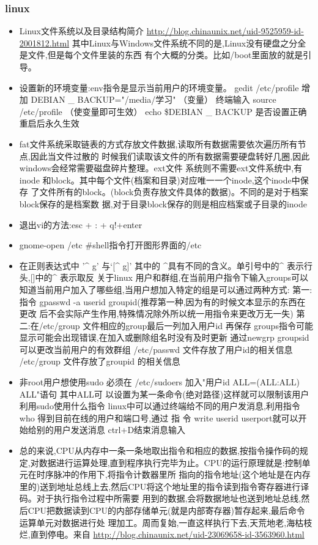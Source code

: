 \documentclass[11pt]{article}
\begin{document}
\subsubsection{linux}
\label{sec-1-2-2}
\begin{itemize}
\item Linux文件系统以及目录结构简介
\url{http://blog.chinaunix.net/uid-9525959-id-2001812.html}
其中Linux与Windows文件系统不同的是,Linux没有硬盘之分全是文件,但是每个文件里装的东西
有个大概的分类。比如/boot里面放的就是引导。
\item 设置新的环境变量:env指令是显示当前用户的环境变量。
gedit /etc/profile
增加 DEBIAN \_ BACKUP="/media/学习" （变量）
终端输入 source /etc/profile  （使变量即可生效）
echo \$DEBIAN \_ BACKUP 是否设置正确
重启后永久生效
\item fat文件系统采取链表的方式存放文件数据,读取所有数据需要依次遍历所有节点,因此当文件过散的
时候我们读取该文件的所有数据需要硬盘转好几圈,因此windows会经常需要磁盘碎片整理。ext文件
系统则不需要ext文件系统中,有inode 和block。其中每个文件(档案和目录)对应唯一一个inode,这个inode中保存
了文件所有的block。(block负责存放文件具体的数据)。不同的是对于档案block保存的是档案数
据,对于目录block保存的则是相应档案或子目录的inode
\item 退出vi的方法:esc + : + q!+enter
\item gnome-open /etc \#shell指令打开图形界面的/etc
\item 在正则表达式中 ’\^{} g’ 与‘[\^{} g]’ 其中的 \^{}具有不同的含义。单引号中的\^{} 表示行头,[]中的\^{} 表示取反
关于linux 用户和群组,在当前用户指令下输入groups可以知道当前用户加入了哪些组,当用户想加入特定的组是可以通过两种方式:
第一:指令 gpasswd -a userid groupid(推荐第一种,因为有的时候文本显示的东西在更改
后不会实际产生作用,特殊情况除外所以统一用指令来更改万无一失)
第二:在/etc/group 文件相应的group最后一列加入用户id 再保存
groups指令可能显示可能会出现错误,在加入或删除组名时没有及时更新
通过newgrp groupsid 可以更改当前用户的有效群组 /etc/passwd 文件存放了用户id的相关信息
/etc/group 文件存放了groupid 的相关信息
\item 非root用户想使用sudo 必须在 /etc/sudoers 加入"用户id ALL=(ALL:ALL) ALL"语句 其中ALL可
  以设置为某一条命令(绝对路径)这样就可以限制该用户利用sudo使用什么指令
linux中可以通过终端给不同的用户发消息,利用指令who 得到目前在线的用户和端口号,通过 指
令 write userid userport就可以开始给别的用户发送消息 ctrl+D结束消息输入
\item 总的来说,CPU从内存中一条一条地取出指令和相应的数据,按指令操作码的规定,对数据进行运算处理,直到程序执行完毕为止。CPU的运行原理就是:控制单元在时序脉冲的作用下,将指令计数器里所
指向的指令地址(这个地址是在内存里的)送到地址总线上去,然后CPU将这个地址里的指令读到指令寄存器进行译码。对于执行指令过程中所需要
用到的数据,会将数据地址也送到地址总线,然后CPU把数据读到CPU的内部存储单元(就是内部寄存器)暂存起来,最后命令运算单元对数据进行处
理加工。周而复始,一直这样执行下去,天荒地老,海枯枝烂,直到停电。来自 \url{http://blog.chinaunix.net/uid-23069658-id-3563960.html}
\end{itemize}
\end{document}
